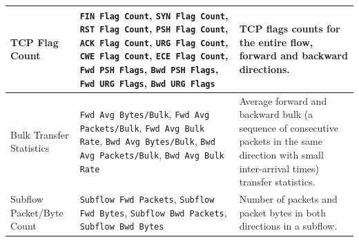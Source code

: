\begin{longtable}{|p{4cm}|p{6cm}|p{6cm}|}
    \\
    \hline
    TCP Flag Count                                                                                                                                                                                                                                                                                         &
    \texttt{FIN Flag Count}, \texttt{SYN Flag Count}, \texttt{RST Flag Count}, \texttt{PSH Flag Count}, \texttt{ACK Flag Count}, \texttt{URG Flag Count}, \texttt{CWE Flag Count}, \texttt{ECE Flag Count}, \texttt{Fwd PSH Flags}, \texttt{Bwd PSH Flags}, \texttt{Fwd URG Flags}, \texttt{Bwd URG Flags} & TCP flags counts for the entire flow, forward and backward directions.                                                                                                                                                                                                           \\
    \hline
    Bulk Transfer Statistics                                                                                                                                                                                                                                                                               &
    \texttt{Fwd Avg Bytes/Bulk}, \texttt{Fwd Avg Packets/Bulk}, \texttt{Fwd Avg Bulk Rate}, \texttt{Bwd Avg Bytes/Bulk}, \texttt{Bwd Avg Packets/Bulk}, \texttt{Bwd Avg Bulk Rate}                                                                                                                         & Average forward and backward bulk (a sequence of consecutive packets in the same direction with small inter-arrival times) transfer statistics.                                                                                                                                  \\
    \hline
    Subflow Packet/Byte Count                                                                                                                                                                                                                                                                              &
    \texttt{Subflow Fwd Packets}, \texttt{Subflow Fwd Bytes}, \texttt{Subflow Bwd Packets}, \texttt{Subflow Bwd Bytes}                                                                                                                                                                                     & Number of packets and packet bytes in both directions in a subflow.                                                                                                                                                                                                              \\

\end{longtable}
